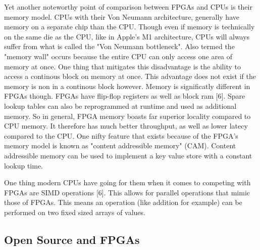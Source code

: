 \documentclass{article}
\begin{document}
    Yet another noteworthy point of comparison between FPGAs and CPUs is their memory model.
    CPUs with their Von Neumann architecture, generally have memory on a separate chip
    than the CPU. Though even if memory is technically on the same die as the CPU, like in Apple's
    M1 architecture, CPUs will always suffer from what is called the "Von Neumann bottleneck".
    Also termed the "memory wall" occurs because the entire CPU can only access one area
    of memory at once. One thing that mitigates this disadvantage is the ability to
    access a continous block on memory at once. This advantage does not exist if the memory
    is non in a continous block however. Memory is significatly different in FPGAs though.
    FPGAs have flip-flop registers as well as block ram [6]. Spare lookup tables can
    also be reprogrammed at runtime and used as additional memory. So in general, FPGA memory
    boasts far superior locality compared to CPU memory. It therefore has much better
    throughput, as well as lower latecy compared to the CPU.
    One nifty feature that exists because of the FPGA's memory model is known as
    "content addressible memory" (CAM). Content addressible memory can be used
    to implement a key value store with a constant lookup time.

    One thing modern CPUs have going for them when it comes to competing with FPGAs are
    SIMD operations [6]. This allows for parallel operations that mimic those of FPGAs.
    This means an operation (like addition for example) can be performed on two fixed
    sized arrays of values.

    \subsection{Open Source and FPGAs}
\end{document}
